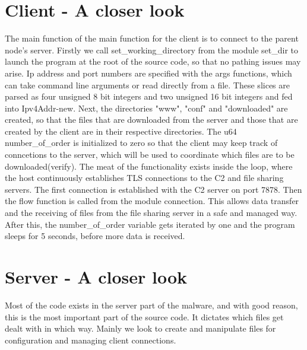 \documentclass[../main.tex]{subfiles}
\begin{document}
	\vspace{10pt}
	\section{Client - A closer look}


The main function of the main function for the client is to connect to the parent node's server.
Firstly we call set\_working\_directory from the module set\_dir to launch the program at the root of the source code, so that no pathing issues may arise.
Ip address and port numbers are specified with the args functions, which can take command line arguments or read directly from a file. These slices are parsed as four unsigned 8 bit
integers and two unsigned 16 bit integers and fed into Ipv4Addr-new. Next, the directories "www", "conf" and "downloaded" are created, so that the files that are downloaded from 
the server and those that are created by the client are in their respective directories. The u64 number\_of\_order is initialized to zero so that the client may keep track of conncetions
to the server, which will be used to coordinate which files are to be downloaded(verify). The meat of the functionality exists inside the loop, where the host continuously
establishes TLS connections to the C2 and file sharing servers. The first connection is established with the C2 server on port 7878. Then the flow function is 
called from the module connection. This allows data transfer and the receiving of files from the file sharing server in a safe and managed way. After this, the number\_of\_order variable
gets iterated by one and the program sleeps for 5 seconds, before more data is received.
	\vspace{10pt}

	\section{Server -  A closer look}


Most of the code exists in the server part of the malware, and with good reason, this is the most important part of the source code. It dictates which files get dealt with in which way.
Mainly we look to create and manipulate files for configuration and managing client connections.
\end{document}
